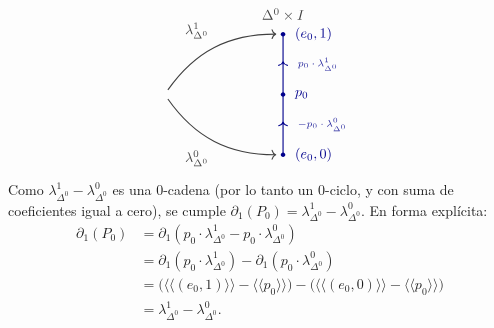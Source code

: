 \begin{dem}
\[\begin{tikzpicture}[baseline=(current bounding box.center), scale=0.95]
    \coordinate (B) at (3.2, 0.0);
    \coordinate (M) at (3.2, 1.6);
    \coordinate (T) at (3.2, 3.2);

    \node[above=6pt, black!75] at (T) {$\Delta^0 \times I$};

    \draw[->, thick, blue!55!black] (B) -- (3.2, 0.88);
    \draw[thick, blue!55!black] (3.2, 0.80) -- (M);
    \draw[->, thick, blue!55!black] (M) -- (3.2, 2.48);
    \draw[thick, blue!55!black] (3.2, 2.40) -- (T);

    \draw[->, thick, black!75] (0.16, 1.72) to[out=55, in=180]
        node[above left=2pt, pos=0.52] {$\lambda_{\Delta^0}^1$} (3.02, 3.2);
    \draw[->, thick, black!75] (0.16, 1.48) to[out=-55, in=180]
        node[below left=2pt, pos=0.52] {$\lambda_{\Delta^0}^0$} (3.02, 0.0);

    \fill[blue!55!black] (T) circle (1.7pt) node[right=5pt] {$(e_0, 1)$};
    \fill[blue!55!black] (M) circle (1.7pt) node[right=5pt] {$p_0$};
    \fill[blue!55!black] (B) circle (1.7pt) node[right=5pt] {$(e_0, 0)$};

    \node[right=7pt, blue!55!black!85] at (3.2, 2.4) {\scriptsize $p_0 \cdot \lambda_{\Delta^0}^1$};
    \node[right=7pt, blue!55!black!85] at (3.2, 0.8) {\scriptsize $-p_0 \cdot \lambda_{\Delta^0}^0$};
\end{tikzpicture}
\]
Como $\lambda_{\Delta^0}^1 - \lambda_{\Delta^0}^0$ es una $0$-cadena (por lo tanto un $0$-ciclo, y con suma de coeficientes igual a cero), se cumple $\partial_1(P_0) = \lambda_{\Delta^0}^1 - \lambda_{\Delta^0}^0$. En forma explícita:
\begin{align*}
\partial_1(P_0) &= \partial_1(p_0 \cdot \lambda_{\Delta^0}^1 - p_0 \cdot \lambda_{\Delta^0}^0) \\
&= \partial_1(p_0 \cdot \lambda_{\Delta^0}^1) - \partial_1(p_0 \cdot \lambda_{\Delta^0}^0) \\
&= \bigl(\langle\!\langle (e_0, 1) \rangle\!\rangle - \langle\!\langle p_0 \rangle\!\rangle\bigr) - \bigl(\langle\!\langle (e_0, 0) \rangle\!\rangle - \langle\!\langle p_0 \rangle\!\rangle\bigr) \\
&= \lambda_{\Delta^0}^1 - \lambda_{\Delta^0}^0.
\end{align*}


\end{dem}
